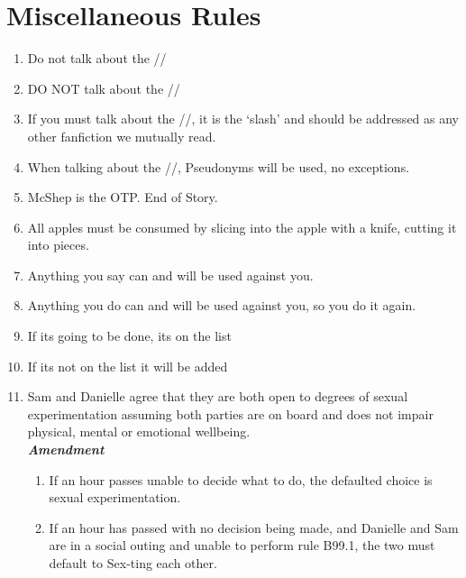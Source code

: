 \section{Miscellaneous Rules}

 \begin{enumerate}
   \item Do not talk about the //
   \item DO NOT talk about the //
   \item If you must talk about the //, it is the  `slash' and should be addressed as any other fanfiction we mutually read.
   \item When talking about the //, Pseudonyms will be used, no exceptions.
   \item McShep is the OTP. End of Story.
   \setcounter{enumi}{8}
   \item All apples must be consumed by slicing into the apple with a knife, cutting it into pieces.
   \setcounter{enumi}{11}
   \item Anything you say can and will be used against you.
   \item Anything you do can and will be used against you, so you do it again.
   \setcounter{enumi}{33}
   \item If its going to be done, its on the list
   \item If its not on the list it will be added
   \setcounter{enumi}{98}
   \item Sam and Danielle agree that they are both open to degrees of sexual experimentation assuming 
   both parties are on board and does not impair physical, mental or emotional wellbeing. 
   \\ \textbf{\emph{Amendment}}
  \begin{enumerate}
    \item If an hour passes unable to decide what to do, the defaulted choice is sexual experimentation.
    \item  If an hour has passed with no decision being made, and Danielle and Sam are in a social outing 
    and unable to perform rule B99.1, the two must default to Sex-ting each other. 
  \end{enumerate}
 \end{enumerate}
 
